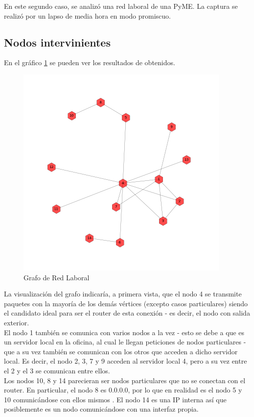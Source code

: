 En este segundo caso, se analizó una red laboral de una PyME. La captura se realizó por un lapso de media hora en modo promiscuo.

\subsection{Nodos intervinientes}
En el gráfico \ref{laboral:graph} se pueden ver los resultados de obtenidos.

\begin{figure}[h!]
    \centering                                                       
    \includegraphics[width=300pt]{img/laboralGraph.png}
    \caption{Grafo de Red Laboral}
    \label{laboral:graph}
\end{figure}

La visualización del grafo indicaría, a primera vista, que el nodo 4 se transmite paquetes con la mayoría de los demás vértices (excepto casos particulares) siendo el candidato ideal para ser el router de esta conexión - es decir, el nodo con salida exterior.\\

El nodo 1 también se comunica con varios nodos a la vez - esto se debe a que es un servidor local en la oficina, al cual le llegan peticiones de nodos particulares - que a su vez también se comunican con los otros que acceden a dicho servidor local. Es decir, el nodo 2, 3, 7 y 9 acceden al servidor local 4, pero a su vez entre el 2 y el 3 se comunican entre ellos.\\

Los nodos 10, 8 y 14 parecieran ser nodos particulares que no se conectan con el router. En particular, el nodo 8 es 0.0.0.0, por lo que en realidad es el nodo 5 y 10 comunicándose con ellos mismos . El nodo 14 es una IP interna así que posiblemente es un nodo comunicándose con una interfaz propia.\\

